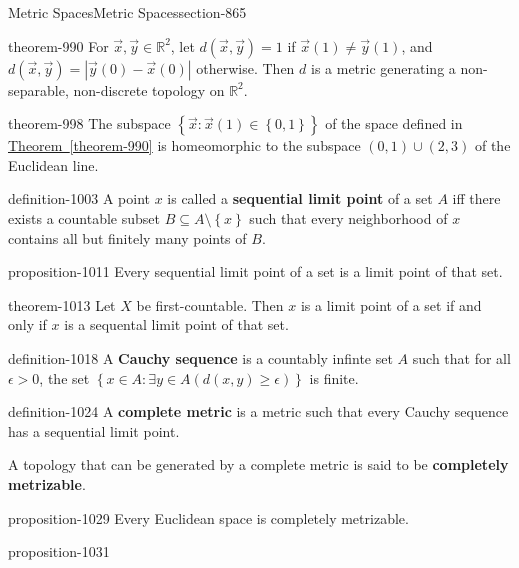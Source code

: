 \documentclass[oneside,10pt,]{article}
\newcommand{\terminology}[1]{\textbf{#1}}
\newcommand{\mb}{\mathbb}
\newcommand{\setBuilder}[2]{\left\{#1:#2\right\}}
\newcommand{\setList}[1]{\left\{#1\right\}}
\newcommand{\gt}{>}
\begin{document}
\begin{sectionptx}{Metric Spaces}{}{Metric Spaces}{}{}{section-865}
\begin{theorem}{}{}{theorem-990}
For \(\vec x,\vec y\in\mb R^2\), let \(d(\vec x,\vec y)=1\) if \(\vec x(1)\not=\vec y(1)\), and \(d(\vec x,\vec y)=|\vec y(0)-\vec x(0)|\) otherwise. Then \(d\) is a metric generating a non-separable, non-discrete topology on \(\mb R^2\).%
\end{theorem}
\begin{theorem}{}{}{theorem-998}%
\hypertarget{p-999}{}%
The subspace \(\setBuilder{\vec x}{\vec{x}(1)\in\setList{0,1}}\) of the space defined in \hyperref[theorem-990]{Theorem~\ref{theorem-990}} is homeomorphic to the subspace \((0,1)\cup(2,3)\) of the Euclidean line.%
\end{theorem}
\begin{definition}{}{definition-1003}%
\hypertarget{p-1004}{}%
A point \(x\) is called a \terminology{sequential limit point} of a set \(A\) iff there exists a countable subset \(B\subseteq A\setminus\setList{x}\) such that every neighborhood of \(x\) contains all but finitely many points of \(B\).%
\end{definition}
\begin{proposition}{}{}{proposition-1011}%
\hypertarget{p-1012}{}%
Every sequential limit point of a set is a limit point of that set.%
\end{proposition}
\begin{theorem}{}{}{theorem-1013}%
\hypertarget{p-1014}{}%
Let \(X\) be first-countable. Then \(x\) is a limit point of a set if and only if \(x\) is a sequental limit point of that set.%
\end{theorem}
\begin{definition}{}{definition-1018}%
\hypertarget{p-1019}{}%
A \terminology{Cauchy sequence} is a countably infinte set \(A\) such that for all \(\epsilon\gt0\), the set \(\setBuilder{x\in A}{\exists y\in A(d(x,y)\geq\epsilon)}\) is finite.%
\end{definition}
\begin{definition}{}{definition-1024}%
\hypertarget{p-1025}{}%
A \terminology{complete metric} is a metric such that every Cauchy sequence has a sequential limit point.%
\par
\hypertarget{p-1027}{}%
A topology that can be generated by a complete metric is said to be \terminology{completely metrizable}.%
\end{definition}
\begin{proposition}{}{}{proposition-1029}%
\hypertarget{p-1030}{}%
Every Euclidean space is completely metrizable.%
\end{proposition}
\begin{proposition}{}{}{proposition-1031}%

\end{proposition}
\end{sectionptx}
\end{document}
